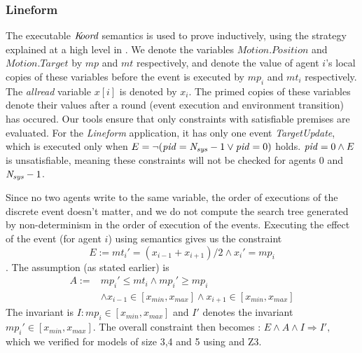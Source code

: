 \subsubsection*{Lineform}
The executable $\emph{K\kern-2pt oord}$ semantics is used to prove  inductively, using the strategy explained at a high level in . We denote the variables $\mathit{Motion.Position}$ and $\mathit{Motion.Target}$ by $\mathit{mp}$ and $\mathit{mt}$ respectively,  and denote the value of agent $i$'s local copies of these variables before the event is executed by $\mathit{mp}_i$ and $\mathit{mt}_i$ respectively. The \emph{allread} variable $x[i]$ is denoted by $x_i$. The primed copies of these variables denote their values after a round (event execution and environment transition) has occured. Our tools ensure that only constraints with satisfiable premises are evaluated. For the \emph{Lineform} application, it has only one event \emph{TargetUpdate}, which is executed only when $E =\neg (\mathit{pid} = \mathit{N_{sys}} - 1 \vee \mathit{pid} = 0)$ holds. $\mathit{pid} = 0 \wedge E$ is unsatisfiable, meaning these constraints will not be checked for agents $0$ and $\mathit{N_{sys}} - 1$.


Since no two agents write to the same variable, the order of executions of the discrete event doesn't matter, and we do not compute the search tree generated by non-determinism in the order of execution of the events. Executing the effect of the event (for agent $i$) using \K semantics gives us the constraint $$E := mt_i' = (x_{i-1} + x_{i+1})/2  \wedge x_i' = mp_i$$.  The assumption (as stated earlier) is \begin{align*}A := &mp_i' \leq mt_i \wedge mp_i' \geq mp_i \\ &\wedge  x_{i-1} \in [x_{min}, x_{max}] \wedge x_{i+1}\in [x_{min},x_{max}]\end{align*} The invariant is $I: \mathit{mp}_i \in [x_{min}, x_{max}]$ and $I'$ denotes the invariant $\mathit{mp}_i' \in [x_{min}, x_{max}].$  The overall constraint then becomes :
                   $E \wedge A \wedge I \Rightarrow I',$ which we verified for models of size 3,4 and 5 using \K and Z3.





